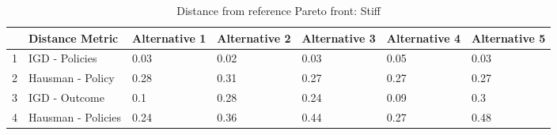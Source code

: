 \begin{table}[ht]
\centering
\begin{tabular}{rllllll}
  \hline
 & Distance Metric & Alternative 1 & Alternative 2 & Alternative 3 & Alternative 4 & Alternative 5 \\ 
  \hline
1 & IGD - Policies & 0.03 & 0.02 & 0.03 & 0.05 & 0.03 \\ 
  2 & Hausman - Policy & 0.28 & 0.31 & 0.27 & 0.27 & 0.27 \\ 
  3 & IGD - Outcome & 0.1 & 0.28 & 0.24 & 0.09 & 0.3 \\ 
  4 & Hausman - Policies & 0.24 & 0.36 & 0.44 & 0.27 & 0.48 \\ 
   \hline
\end{tabular}
\caption{Distance from reference Pareto front: Stiff} 
\label{distance_matrix_High.tex}
\end{table}
